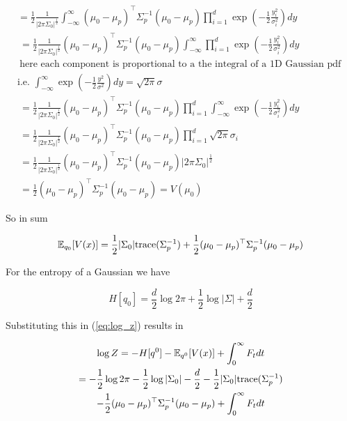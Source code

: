 \documentclass{article}
\begin{document}
\begin{gather}
    = \frac{1}{2}\frac{1}{|{2\pi}\Sigma_0|^{\frac{1}{2}}} \int_{-\infty}^{\infty} 
    (\mu_0-\mu_p)^{\top} \Sigma^{-1}_p (\mu_0-\mu_p) 
    \prod_{i=1}^d \exp \left( - \frac{1}{2} \frac{y_i^2}{\sigma_i^2} \right)dy \\
    \
    = \frac{1}{2}\frac{1}{|{2\pi}\Sigma_0|^{\frac{1}{2}}} 
    (\mu_0-\mu_p)^{\top} \Sigma^{-1}_p (\mu_0-\mu_p) 
    \int_{-\infty}^{\infty} 
    \prod_{i=1}^d \exp \left( - \frac{1}{2} \frac{y_i^2}{\sigma_i^2} \right)dy \\
    \
    \textrm{here each component is proportional to a the integral of a 1D Gaussian pdf } \\
    \textrm{i.e. } \int_{-\infty}^{\infty}  \exp(- \frac{1}{2} \frac{y^2}{\sigma^2} ) dy = \sqrt{2 \pi} \sigma \\
    \
    = \frac{1}{2}\frac{1}{|{2\pi}\Sigma_0|^{\frac{1}{2}}} 
    (\mu_0-\mu_p)^{\top} \Sigma^{-1}_p (\mu_0-\mu_p) 
    \prod_{i=1}^d \int_{-\infty}^{\infty} \exp \left( - \frac{1}{2} \frac{y_i^2}{\sigma_i^2} \right)dy \\
    \
    = \frac{1}{2}\frac{1}{|{2\pi}\Sigma_0|^{\frac{1}{2}}} 
    (\mu_0-\mu_p)^{\top} \Sigma^{-1}_p (\mu_0-\mu_p) 
    \prod_{i=1}^d \sqrt{2\pi} \sigma_i \\
    \
    = \frac{1}{2}\frac{1}{|{2\pi}\Sigma_0|^{\frac{1}{2}}} 
    (\mu_0-\mu_p)^{\top} \Sigma^{-1}_p (\mu_0-\mu_p) 
    |2\pi \Sigma_0|^{\frac{1}{2}} \\
    \
    = \frac{1}{2} (\mu_0-\mu_p)^{\top} \Sigma^{-1}_p (\mu_0-\mu_p)  = V(\mu_0)
\end{gather}

So in sum

\begin{gather}
    \mathbb{E}_{q_0}[V(x)] = 
    \frac{1}{2}|\Sigma_0| \textrm{trace}( \Sigma_p^{-1} )
    + \frac{1}{2} (\mu_0-\mu_p)^{\top} \Sigma^{-1}_p (\mu_0-\mu_p)
\end{gather}

For the entropy of a Gaussian we have

\begin{equation}
    H[q_0] = \frac{d}{2} \log 2\pi + \frac{1}{2} \log |\Sigma| + \frac{d}{2}
\end{equation}

Substituting this in (\ref{eq:log_z}) results in

\begin{gather}
\log Z = -H[q^0] - \mathbb{E}_{q^0}[V(x)] +\int_0^\infty F_t dt \\
       = - \frac{1}{2}\log 2\pi - \frac{1}{2}\log |\Sigma_0| 
       - \frac{d}{2} - \frac{1}{2} |\Sigma_0| \textrm{trace}( \Sigma_p^{-1} ) \\
       - \frac{1}{2} (\mu_0 - \mu_p)^{\top} \Sigma_p^{-1} (\mu_0 - \mu_p) + \int_0^\infty F_t dt 
\end{gather}
\end{document}
